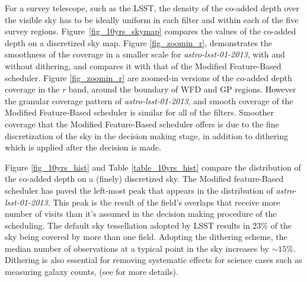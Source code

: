 \documentclass[12pt]{aastex62}
\theoremstyle{definition}
\begin{document}
%

For a survey telescope, such as the LSST, the density of the co-added depth over the visible sky has to be ideally uniform in each filter and within each of the five survey regions. Figure~\ref{fig_10yrs_skymap} compares the values of the co-added depth on a discretized sky map. Figure \ref{fig_zoomin_r}, demonstrates the smoothness of the coverage in a smaller scale for \textit{astro-lsst-01-2013}, with and without dithering, and compares it with that of the Modified Feature-Based scheduler. Figure \ref{fig_zoomin_r} are zoomed-in versions of the co-added depth coverage in the \textit{r} band, around the boundary of WFD and GP regions. However the granular coverage pattern of \textit{astro-lsst-01-2013}, and smooth coverage of the Modified Feature-Based scheduler is similar for all of the filters. Smoother coverage that the Modified Feature-Based scheduler offers is due to the fine discretization of the sky in the decision making stage, in addition to dithering which is applied after the decision is made. 

Figure \ref{fig_10yrs_hist} and Table \ref{table_10yrs_hist} compare the distribution of the co-added depth on a (finely) discretized sky. The Modified feature-Based scheduler has paved the left-most peak that appears in the distribution of \textit{astro-lsst-01-2013}. This peak is the result of the field's overlaps that receive more number of visits than it's assumed in the decision making procedure of the scheduling. The default sky tessellation adopted by LSST results in 23\% of the sky being covered by more than one field. Adopting the dithering scheme, the median number of observations at a typical point in the sky increases by $\sim15$\%. Dithering is also essential for removing systematic effects for science cases such as measuring galaxy counts, (see \citep{Awan2016} for more details).
\end{document}
